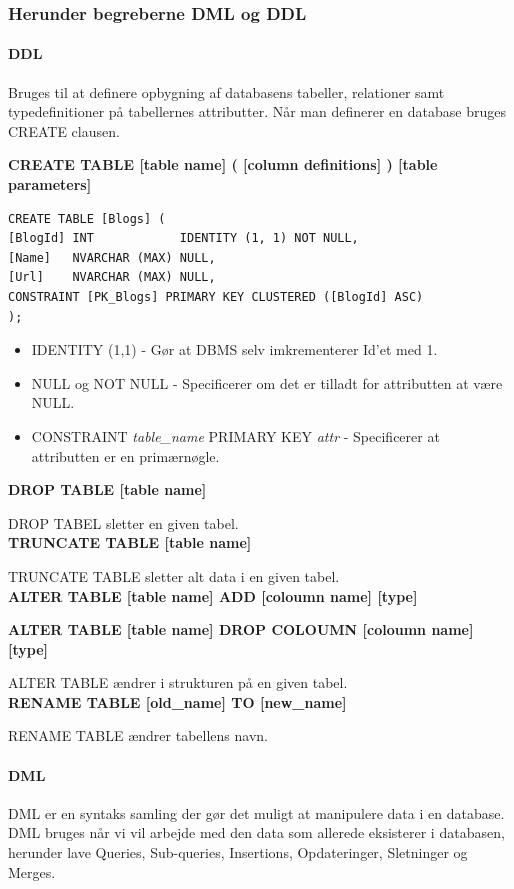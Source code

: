\subsubsection{Herunder begreberne DML og DDL}

\paragraph{DDL}
Bruges til at definere opbygning af databasens tabeller, relationer samt typedefinitioner på tabellernes attributter. Når man definerer en database bruges CREATE clausen.

\textbf{CREATE TABLE [table name] ( [column definitions] ) [table parameters]}

\begin{lstlisting}[caption=eksempel på CREATE]
CREATE TABLE [Blogs] (
[BlogId] INT            IDENTITY (1, 1) NOT NULL,
[Name]   NVARCHAR (MAX) NULL,
[Url]    NVARCHAR (MAX) NULL,
CONSTRAINT [PK_Blogs] PRIMARY KEY CLUSTERED ([BlogId] ASC)
);
\end{lstlisting}

\begin{itemize}
	\item IDENTITY (1,1) - Gør at DBMS selv imkrementerer Id'et med 1.
	\item NULL og NOT NULL - Specificerer om det er tilladt for attributten at være NULL.
	\item CONSTRAINT \textit{table\_name} PRIMARY KEY \textit{attr} - Specificerer at attributten er en primærnøgle.
\end{itemize}

\textbf{DROP TABLE [table name]}

DROP TABEL sletter en given tabel.\\

\textbf{TRUNCATE TABLE [table name]}

TRUNCATE TABLE sletter alt data i en given tabel.\\

\textbf{ALTER TABLE [table name] ADD [coloumn name] [type]}

\textbf{ALTER TABLE [table name] DROP COLOUMN [coloumn name] [type]}

ALTER TABLE ændrer i strukturen på en given tabel.\\

\textbf{RENAME TABLE [old\_name] TO [new\_name]}

RENAME TABLE ændrer tabellens navn.

\paragraph{DML}
DML er en syntaks samling der gør det muligt at manipulere data i en database.
DML bruges når vi vil arbejde med den data som allerede eksisterer i databasen, herunder lave Queries, Sub-queries, Insertions, Opdateringer, Sletninger og Merges.

